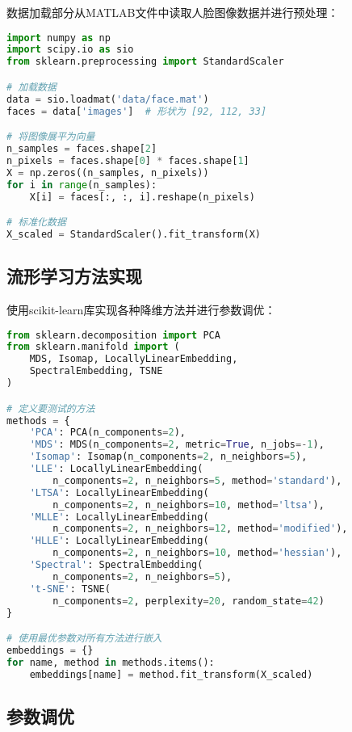 \documentclass{article}
\begin{document}
数据加载部分从MATLAB文件中读取人脸图像数据并进行预处理：

\begin{lstlisting}[language=Python]
import numpy as np
import scipy.io as sio
from sklearn.preprocessing import StandardScaler

# 加载数据
data = sio.loadmat('data/face.mat')
faces = data['images']  # 形状为 [92, 112, 33]

# 将图像展平为向量
n_samples = faces.shape[2]
n_pixels = faces.shape[0] * faces.shape[1]
X = np.zeros((n_samples, n_pixels))
for i in range(n_samples):
    X[i] = faces[:, :, i].reshape(n_pixels)

# 标准化数据
X_scaled = StandardScaler().fit_transform(X)
\end{lstlisting}

\subsection{流形学习方法实现}

使用scikit-learn库实现各种降维方法并进行参数调优：

\begin{lstlisting}[language=Python]
from sklearn.decomposition import PCA
from sklearn.manifold import (
    MDS, Isomap, LocallyLinearEmbedding, 
    SpectralEmbedding, TSNE
)

# 定义要测试的方法
methods = {
    'PCA': PCA(n_components=2),
    'MDS': MDS(n_components=2, metric=True, n_jobs=-1),
    'Isomap': Isomap(n_components=2, n_neighbors=5),
    'LLE': LocallyLinearEmbedding(
        n_components=2, n_neighbors=5, method='standard'),
    'LTSA': LocallyLinearEmbedding(
        n_components=2, n_neighbors=10, method='ltsa'),
    'MLLE': LocallyLinearEmbedding(
        n_components=2, n_neighbors=12, method='modified'),
    'HLLE': LocallyLinearEmbedding(
        n_components=2, n_neighbors=10, method='hessian'),
    'Spectral': SpectralEmbedding(
        n_components=2, n_neighbors=5),
    't-SNE': TSNE(
        n_components=2, perplexity=20, random_state=42)
}

# 使用最优参数对所有方法进行嵌入
embeddings = {}
for name, method in methods.items():
    embeddings[name] = method.fit_transform(X_scaled)
\end{lstlisting}

\subsection{参数调优}
\end{document}
